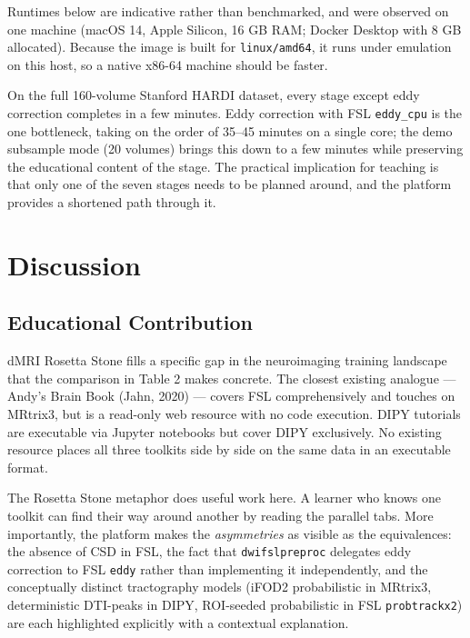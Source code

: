 \documentclass[12pt,a4paper]{article}
\begin{document}
Runtimes below are indicative rather than benchmarked, and were observed on one machine (macOS 14, Apple Silicon, 16 GB RAM; Docker Desktop with 8 GB allocated). Because the image is built for \texttt{linux/amd64}, it runs under emulation on this host, so a native x86-64 machine should be faster.

On the full 160-volume Stanford HARDI dataset, every stage except eddy correction completes in a few minutes. Eddy correction with FSL \texttt{eddy\_cpu} is the one bottleneck, taking on the order of 35--45 minutes on a single core; the demo subsample mode (20 volumes) brings this down to a few minutes while preserving the educational content of the stage. The practical implication for teaching is that only one of the seven stages needs to be planned around, and the platform provides a shortened path through it.

\section{Discussion}\label{discussion}

\subsection{Educational Contribution}\label{educational-contribution}

dMRI Rosetta Stone fills a specific gap in the neuroimaging training landscape that the comparison in Table 2 makes concrete. The closest existing analogue --- Andy's Brain Book (Jahn, 2020) --- covers FSL comprehensively and touches on MRtrix3, but is a read-only web resource with no code execution. DIPY tutorials are executable via Jupyter notebooks but cover DIPY exclusively. No existing resource places all three toolkits side by side on the same data in an executable format.

The Rosetta Stone metaphor does useful work here. A learner who knows one toolkit can find their way around another by reading the parallel tabs. More importantly, the platform makes the \emph{asymmetries} as visible as the equivalences: the absence of CSD in FSL, the fact that \texttt{dwifslpreproc} delegates eddy correction to FSL \texttt{eddy} rather than implementing it independently, and the conceptually distinct tractography models (iFOD2 probabilistic in MRtrix3, deterministic DTI-peaks in DIPY, ROI-seeded probabilistic in FSL \texttt{probtrackx2}) are each highlighted explicitly with a contextual explanation.
\end{document}

